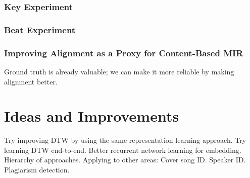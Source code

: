 \subsubsection{Key Experiment}

\subsubsection{Beat Experiment}

\subsubsection{Improving Alignment as a Proxy for Content-Based MIR}

Ground truth is already valuable; we can make it more reliable by making alignment better.

\section{Ideas and Improvements}
\label{sec:ideas}

Try improving DTW by using the same representation learning approach.
Try learning DTW end-to-end.
Better recurrent network learning for embedding.
Hierarchy of approaches.
Applying to other areas: Cover song ID.  Speaker ID.  Plagiarism detection.
